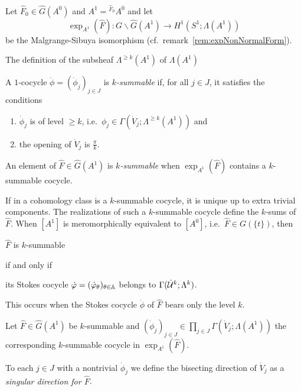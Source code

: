 Let $\hat F_0\in\hat G(A^0)$ and $A^1={}^{\hat F_0}\!A^0$ and let
\[
  \exp_{A^1}(\hat F):G\backslash\hat G(A^1) \to H^1(S^1;\Lambda(A^1))
\]
be the Malgrange-Sibuya isomorphism (cf.\ remark~\ref{rem:expNonNormalForm}).

The definition of the subsheaf $\Lambda^{\geq k}(A^1)$ of $\Lambda(A^1)$
 \TODO{}

\begin{defn}
  A $1$-cocycle $\dot\phi=(\dot\phi_j)_{j\in J}$ is \emph{$k$-summable} if, for
  all $j\in J$, it satisfies the conditions
  \begin{enumerate}
    \item $\dot\phi_j$ is of level $\geq k$,
      i.e.\ $\phi_j\in\Gamma(\dot V_j;\Lambda^{\geq k}(A^1))$ and
    \item the opening of $\dot V_j$ is $\frac{\pi}{k}$.
  \end{enumerate}
  An element of $\hat F\in\hat G(A^1)$ is \emph{$k$-summable} when
  $\exp_{A^1}(\hat F)$ contains a $k$-summable cocycle.
\end{defn}

If in a cohomology class is a $k$-summable cocycle, it is unique up to extra
trivial components.
The realizations of such a $k$-summable cocycle define the $k$-sums of
$\hat F$.
When $[A^1]$ is meromorphically equivalent to $[A^0]$,
i.e.\ $\hat F\in G(\!\{t\}\!)$, then
\begin{einr}
  $\hat F$ is $k$-summable
\end{einr}
if and only if
\begin{einr}
  its Stokes cocycle $\dot{\varphi}=(\dot{\varphi}_\theta)_{\theta\in\mathbb{A}}$ belongs to
  $\Gamma(\dot{\mathcal{U}}^k;\Lambda^k)$.
\end{einr}
This occurs when the Stokes cocycle $\dot\phi$ of $\hat F$ bears only the level
$k$.

\begin{comment}
  \cite[883]{Loday1994} Turrittin's problem
\end{comment}

\begin{defn}\label{defn:singlDir}
  Let $\hat F\in\hat G(A^1)$ be $k$-summable and $(\dot\phi_j)_{j\in
  J}\in\prod_{j\in J}\Gamma(\dot V_j;\Lambda(A^1))$ the corresponding
  $k$-summable cocycle in $\exp_{A^1}(\hat F)$.

  To each $j\in J$ with a nontrivial $\dot\phi_j$ we define the bisecting
  direction of $\dot V_j$ as a \emph{singular direction for $\hat F$}.
\end{defn}

